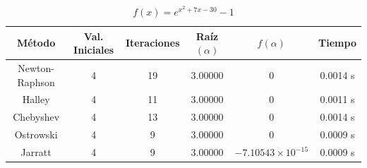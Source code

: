 \begin{table}[H]
\centering

\renewcommand{\arraystretch}{1.3} %
\setlength{\tabcolsep}{12pt}      %

\begin{tabular}{cccccc}
\hline
Método & Val. Iniciales & Iteraciones & Raíz $(\alpha)$ & $f(\alpha)$ & Tiempo \\
\hline

Newton-Raphson & 4 & 19 & 3.00000 & 0                    & 0.0014 s \\

Halley         & 4 & 11 & 3.00000 & 0                    & 0.0011 s \\

Chebyshev      & 4 & 13 & 3.00000 & 0                    & 0.0014 s \\

Ostrowski      & 4 &  9 & 3.00000 & 0                    & 0.0009 s \\

Jarratt        & 4 &  9 & 3.00000 & $-7.10543\times10^{-15}$ & 0.0009 s \\

\hline
\end{tabular}

\caption{$f(x) = e^{x^{2} + 7 x - 30} - 1$}
\end{table}


